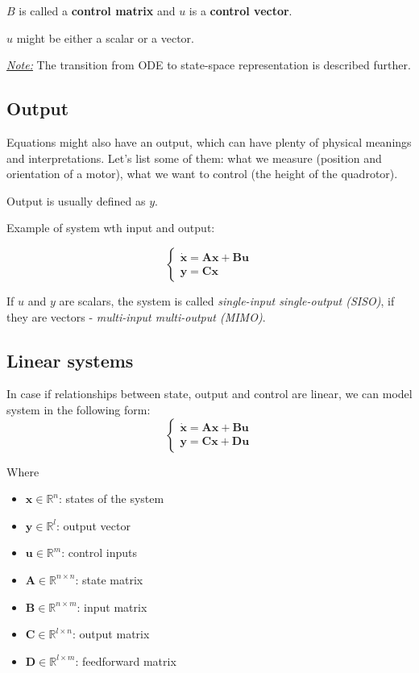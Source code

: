 $B$ is called a \textbf{control matrix} and $u$ is a \textbf{control vector}.

$u$ might be either a scalar or a vector. 

\underline{\textit{Note:}} The transition from ODE to state-space representation is described further. 

\subsection{Output}
Equations might also have an output, which can have plenty of physical meanings and interpretations. Let's list some of them:
what we measure (position and orientation of a motor), what we want to control (the height of the quadrotor).

Output is usually defined as $y$. 

Example of system wth input and output:

\begin{equation}
    \begin{cases}
    \mathbf{\dot{x}}=\mathbf{A}\mathbf{x} + \mathbf{B}\mathbf{u} \\
    \mathbf{y}=\mathbf{C}\mathbf{x}
    \end{cases}
\end{equation}

If $u$ and $y$ are scalars, the system is called \emph{single-input single-output (SISO)}, if they are vectors - \emph{multi-input multi-output (MIMO)}.

\subsection*{Linear systems}
In case if relationships between state, output and control are linear, we can model system in the following form:
\begin{equation}
\begin{cases}
\mathbf{\dot{x}} =\mathbf{A}\mathbf{x} + \mathbf{B}\mathbf{u} \\
\mathbf{y}=\mathbf{C}\mathbf{x} + \mathbf{D}\mathbf{u}
\end{cases}
\end{equation}


Where
\begin{itemize}
    \item $\mathbf{x} \in \mathbb{R}^n$: states of the system
    \item $\mathbf{y} \in \mathbb{R}^l$: output vector
    \item $\mathbf{u} \in \mathbb{R}^m$: control inputs
    \item $\mathbf{A} \in \mathbb{R}^{n \times n}$: state matrix
    \item $\mathbf{B} \in \mathbb{R}^{n \times m}$: input matrix
    \item $\mathbf{C} \in \mathbb{R}^{l \times n}$: output matrix
    \item $\mathbf{D} \in \mathbb{R}^{l \times m}$: feedforward matrix
\end{itemize}


